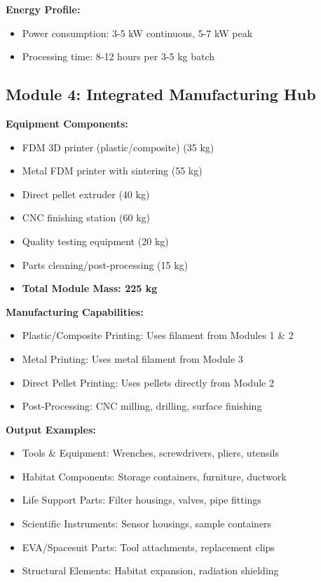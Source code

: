 \documentclass[12pt, a4paper]{article}
\begin{document}
\textbf{Energy Profile:}
\begin{itemize}
    \item Power consumption: 3-5 kW continuous, 5-7 kW peak
    \item Processing time: 8-12 hours per 3-5 kg batch
\end{itemize}

\subsection{Module 4: Integrated Manufacturing Hub}

\textbf{Equipment Components:}
\begin{itemize}
    \item FDM 3D printer (plastic/composite) (35 kg)
    \item Metal FDM printer with sintering (55 kg)
    \item Direct pellet extruder (40 kg)
    \item CNC finishing station (60 kg)
    \item Quality testing equipment (20 kg)
    \item Parts cleaning/post-processing (15 kg)
    \item \textbf{Total Module Mass: 225 kg}
\end{itemize}

\textbf{Manufacturing Capabilities:}
\begin{itemize}
    \item Plastic/Composite Printing: Uses filament from Modules 1 \& 2
    \item Metal Printing: Uses metal filament from Module 3
    \item Direct Pellet Printing: Uses pellets directly from Module 2
    \item Post-Processing: CNC milling, drilling, surface finishing
\end{itemize}

\textbf{Output Examples:}
\begin{itemize}
    \item Tools \& Equipment: Wrenches, screwdrivers, pliers, utensils
    \item Habitat Components: Storage containers, furniture, ductwork
    \item Life Support Parts: Filter housings, valves, pipe fittings
    \item Scientific Instruments: Sensor housings, sample containers
    \item EVA/Spacesuit Parts: Tool attachments, replacement clips
    \item Structural Elements: Habitat expansion, radiation shielding
\end{itemize}
\end{document}

